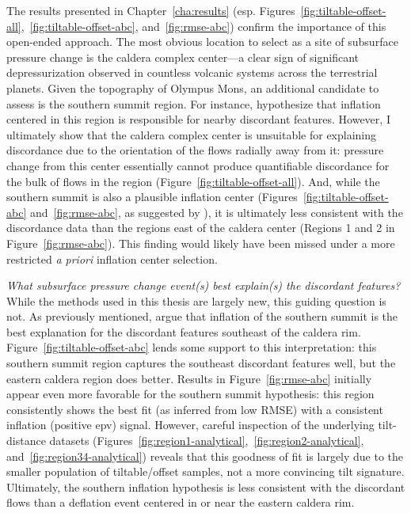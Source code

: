 The results presented in Chapter~\ref{cha:results} (esp. Figures~\ref{fig:tiltable-offset-all},~\ref{fig:tiltable-offset-abc}, and~\ref{fig:rmse-abc}) confirm the importance of this open-ended approach. The most obvious location to select as a site of subsurface pressure change is the caldera complex center---a clear sign of significant depressurization observed in countless volcanic systems across the terrestrial planets. Given the topography of Olympus Mons, an additional candidate to assess is the southern summit region. For instance, \textcite{mouginis-mark_late-stage_2019} hypothesize that inflation centered in this region is responsible for nearby discordant features. However, I ultimately show that the caldera complex center is unsuitable for explaining discordance due to the orientation of the flows radially away from it: pressure change from this center essentially cannot produce quantifiable discordance for the bulk of flows in the region (Figure~\ref{fig:tiltable-offset-all}). And, while the southern summit is also a plausible inflation center (Figures~\ref{fig:tiltable-offset-abc} and~\ref{fig:rmse-abc}, as suggested by \textcite{mouginis-mark_late-stage_2019}), it is ultimately less consistent with the discordance data than the regions east of the caldera center (Regions 1 and 2 in Figure~\ref{fig:rmse-abc}). This finding would likely have been missed under a more restricted \emph{a priori} inflation center selection. 

\emph{What subsurface pressure change event(s) best explain(s) the discordant features?} While the methods used in this thesis are largely new, this guiding question is not. As previously mentioned, \textcite{mouginis-mark_late-stage_2019} argue that inflation of the southern summit is the best explanation for the discordant features southeast of the caldera rim. Figure~\ref{fig:tiltable-offset-abc} lends some support to this interpretation: this southern summit region captures the southeast discordant features well, but the eastern caldera region does better. Results in Figure~\ref{fig:rmse-abc} initially appear even more favorable for the southern summit hypothesis: this region consistently shows the best fit (as inferred from low \acs{RMSE}) with a consistent inflation (positive \acs{epv}) signal. However, careful inspection of the underlying tilt-distance datasets (Figures~\ref{fig:region1-analytical},~\ref{fig:region2-analytical}, and~\ref{fig:region34-analytical}) reveals that this goodness of fit is largely due to the smaller population of tiltable/offset samples, not a more convincing tilt signature. Ultimately, the southern inflation hypothesis is less consistent with the discordant flows than a deflation event centered in or near the eastern caldera rim.

